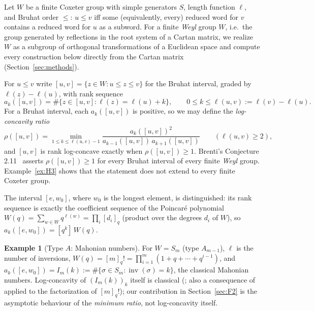 \documentclass[11pt]{amsart}
\theoremstyle{plain}
\theoremstyle{definition}
\newtheorem{example}[theorem]{Example}
\theoremstyle{remark}
\newcommand{\W}{W}
\DeclareMathOperator{\inv}{inv}
\begin{document}
Let $\W$ be a finite Coxeter group with simple generators $S$, length
function $\ell$, and Bruhat order $\le$: $u\le v$ iff some (equivalently,
every) reduced word for $v$ contains a reduced word for $u$ as a subword.
For a finite \emph{Weyl} group $\W$, i.e.\ the group generated by
reflections in the root system of a Cartan matrix, we realize $\W$ as a
subgroup of orthogonal transformations of a Euclidean space and compute
every construction below directly from the Cartan matrix
(Section~\ref{sec:methods}).

For $u\le v$ write $[u,v]=\{z\in \W : u\le z\le v\}$ for the Bruhat interval,
graded by $\ell(z)-\ell(u)$, with rank sequence
\[
a_k([u,v]) = \#\{z\in [u,v] : \ell(z)=\ell(u)+k\}, \qquad 0\le k \le
\ell(u,v):=\ell(v)-\ell(u).
\]
For a Bruhat interval, each $a_k([u,v])$ is positive, so we may define the
\emph{log-concavity ratio}
\[
\rho([u,v]) = \min_{1\le k\le \ell(u,v)-1} \frac{a_k([u,v])^2}{a_{k-1}([u,v])\,
a_{k+1}([u,v])} \qquad (\ell(u,v)\ge 2),
\]
and $[u,v]$ is rank log-concave exactly when $\rho([u,v])\ge 1$. Brenti's Conjecture 2.11~\cite{brenti2024open} asserts
$\rho([u,v])\ge 1$ for every Bruhat interval of every finite \emph{Weyl}
group. Example~\ref{ex:H3} shows that the statement does not extend to
every finite Coxeter group.

The interval $[e,w_0]$, where $w_0$ is the longest element, is distinguished:
its rank sequence is exactly the coefficient sequence of the Poincar\'e
polynomial $W(q) = \sum_{w\in \W} q^{\ell(w)} = \prod_{i} [d_i]_q$ (product
over the degrees $d_i$ of $\W$), so $a_k([e,w_0]) = [q^k]\,W(q)$.

\begin{example}[Type $A$: Mahonian numbers]
For $\W=S_m$ (type $A_{m-1}$), $\ell$ is the number of inversions,
$W(q)=[m]_q! = \prod_{i=1}^m (1+q+\cdots+q^{i-1})$, and $a_k([e,w_0]) =
I_m(k) := \#\{\sigma\in S_m : \inv(\sigma)=k\}$, the classical Mahonian
numbers. Log-concavity of $(I_m(k))_k$ itself is classical
(\cite{bona2004}; also a consequence of~\cite{hoggar1974,kook2006} applied to
the factorization of $[m]_q!$); our contribution in Section~\ref{sec:F2} is
the asymptotic behaviour of the \emph{minimum ratio}, not log-concavity
itself.
\end{example}
\end{document}
